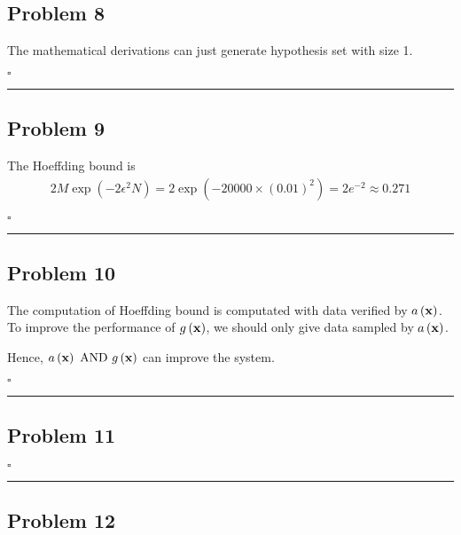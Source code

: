 \documentclass[12pt]{article}
\newcommand*{\QEDB}{\hfill\ensuremath{\square}}
\newcommand{\ParTh}[1]{\left(#1\right)}
\newcommand{\BF}[1]{{\bf#1}}
\newcommand{\horrule}[1]{\rule{\linewidth}{#1}}
\begin{document}
\subsection*{Problem 8}

The mathematical derivations can just generate hypothesis set with size 1.
\begin{comment}
The mathematical derivations with perfect prediction, which means the hypothesis set shatters the $N$ data. So the size of the hypothesis is $2^N$.
\end{comment}

\QEDB

\horrule{0.5pt}

\subsection*{Problem 9}

The Hoeffding bound is
\begin{align}
2M\exp\ParTh{-2\epsilon^2N}=2\exp\ParTh{-20000\times\ParTh{0.01}^2}=2e^{-2}\approx0.271
\end{align}

\QEDB

\horrule{0.5pt}

\subsection*{Problem 10}

The computation of Hoeffding bound is computated with data verified by $a\ParTh{\BF{x}}$. To improve the performance of $g\ParTh{\BF{x}}$, we should only give data sampled by $a\ParTh{\BF{x}}$.

Hence, $a\ParTh{\BF{x}}\text{ AND }g\ParTh{\BF{x}}$ can improve the system.

\QEDB

\horrule{0.5pt}

\subsection*{Problem 11}

\QEDB

\horrule{0.5pt}

\subsection*{Problem 12}
\end{document}
